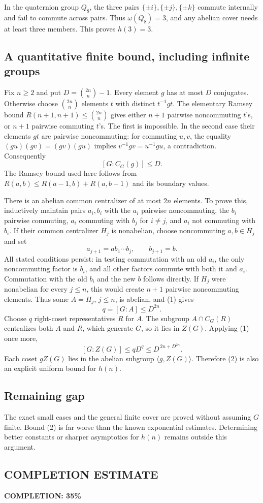 In the quaternion group $Q_8$, the three pairs $\{\pm i\},\{\pm j\},\{\pm k\}$ commute internally and fail to commute across pairs. Thus $\omega(Q_8)=3$, and any abelian cover needs at least three members. This proves $h(3)=3$.

\subsection*{A quantitative finite bound, including infinite groups}
Fix $n\ge2$ and put $D=\binom{2n}{n}-1$. Every element $g$ has at most $D$ conjugates. Otherwise choose $\binom{2n}{n}$ elements $t$ with distinct $t^{-1}gt$. The elementary Ramsey bound
$R(n+1,n+1)\le\binom{2n}{n}$ gives either $n+1$ pairwise noncommuting $t$'s, or $n+1$ pairwise commuting $t$'s. The first is impossible. In the second case their elements $gt$ are pairwise noncommuting: for commuting $u,v$, the equality $(gu)(gv)=(gv)(gu)$ implies $v^{-1}gv=u^{-1}gu$, a contradiction. Consequently
\[
 [G:C_G(g)]\le D. \tag{1}
\]
The Ramsey bound used here follows from $R(a,b)\le R(a-1,b)+R(a,b-1)$ and its boundary values.

There is an abelian common centralizer of at most $2n$ elements. To prove this, inductively maintain pairs $a_i,b_i$ with the $a_i$ pairwise noncommuting, the $b_i$ pairwise commuting, $a_i$ commuting with $b_j$ for $i\ne j$, and $a_i$ not commuting with $b_i$. If their common centralizer $H_j$ is nonabelian, choose noncommuting $a,b\in H_j$ and set
\[
 a_{j+1}=a b_1\cdots b_j,\qquad b_{j+1}=b.
\]
All stated conditions persist: in testing commutation with an old $a_i$, the only noncommuting factor is $b_i$, and all other factors commute with both it and $a_i$. Commutation with the old $b_i$ and the new $b$ follows directly. If $H_j$ were nonabelian for every $j\le n$, this would create $n+1$ pairwise noncommuting elements. Thus some $A=H_j$, $j\le n$, is abelian, and (1) gives
\[
 q=[G:A]\le D^{2n}.
\]
Choose $q$ right-coset representatives $R$ for $A$. The subgroup $A\cap C_G(R)$ centralizes both $A$ and $R$, which generate $G$, so it lies in $Z(G)$. Applying (1) once more,
\[
 [G:Z(G)]\le qD^q\le D^{\,2n+D^{2n}}. \tag{2}
\]
Each coset $gZ(G)$ lies in the abelian subgroup $\langle g,Z(G)\rangle$. Therefore (2) is also an explicit uniform bound for $h(n)$.

\subsection*{Remaining gap}
The exact small cases and the general finite cover are proved without assuming $G$ finite. Bound (2) is far worse than the known exponential estimates. Determining better constants or sharper asymptotics for $h(n)$ remains outside this argument.
\subsection*{COMPLETION ESTIMATE}
\textbf{COMPLETION: 35\%}

